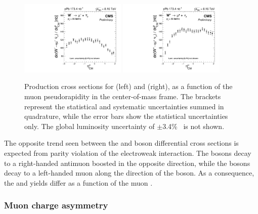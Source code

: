 \begin{figure}[htbp]
 \begin{center}
  \includegraphics[width=0.45\textwidth]{Figures/WBoson/Results/DATA/PA/Cross_Section/gr_WToMuMi_PA_Cross_Section_EffTnP_Nominal.pdf}
  \includegraphics[width=0.45\textwidth]{Figures/WBoson/Results/DATA/PA/Cross_Section/gr_WToMuPl_PA_Cross_Section_EffTnP_Nominal.pdf}
 \end{center}
 \caption{Production cross sections for \WToMuNuPl (left) and \WToMuNuMi (right), as a function of the muon pseudorapidity in the center-of-mass frame. The brackets represent the statistical and systematic uncertainties summed in quadrature, while the error bars show the statistical uncertainties only. The global luminosity uncertainty of $\pm$3.4\%~\cite{LUMI} is not shown. }
 \label{fig:CrossSection_WToMu_PA}
\end{figure}

The opposite trend seen between the {\PWp} and {\PWm} boson differential cross sections is expected from parity violation of the electroweak interaction. The {\PWp} bosons decay to a right-handed antimuon boosted in the opposite direction, while the {\PWm} bosons decay to a left-handed muon along the direction of the {\PWm} boson. As a consequence, the {\PGmp} and {\PGmm} yields differ as a function of the muon \etaCM.

\subsubsection{Muon charge asymmetry} \label{sec:WBoson_Results_Observables_ChargeAsymmetry}

